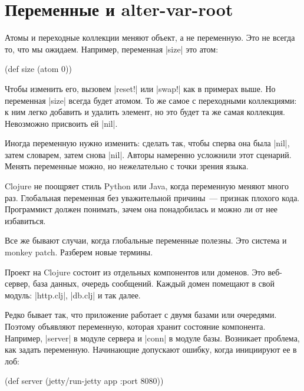 \section{Переменные и alter-var-root}

\label{alter-var-root}

Атомы и переходные коллекции меняют объект, а не переменную. Это не всегда то,
что мы ожидаем. Например, переменная \spverb|size| это атом:

\begin{english}
  \begin{clojure}
(def size (atom 0))
  \end{clojure}
\end{english}

Чтобы изменить его, вызовем \spverb|reset!| или \spverb|swap!| как в примерах
выше. Но переменная \spverb|size| всегда будет атомом. То же самое с переходными
коллекциями: к ним легко добавить и удалить элемент, но это будет та же самая
коллекция. Невозможно присвоить ей \spverb|nil|.

Иногда переменную нужно изменить: сделать так, чтобы сперва она была
\spverb|nil|, затем словарем, затем снова \spverb|nil|. Авторы намеренно
усложнили этот сценарий. Менять переменные можно, но нежелательно с точки зрения
языка.

Clojure не поощряет стиль Python или Java, когда переменную меняют много
раз. Глобальная переменная без уважительной причины~--- признак плохого кода.
Программист должен понимать, зачем она понадобилась и можно ли от нее
избавиться.

Все же бывают случаи, когда глобальные переменные полезны. Это система и monkey
patch. Разберем новые термины.

Проект на Clojure состоит из отдельных компонентов или доменов. Это веб-сервер,
база данных, очередь сообщений. Каждый домен помещают в свой модуль:
\spverb|http.clj|, \spverb|db.clj| и так далее.

Редко бывает так, что приложение работает с двумя базами или очередями. Поэтому
объявляют переменную, которая хранит состояние компонента. Например,
\spverb|server| в модуле сервера и \spverb|conn| в модуле базы. Возникает
проблема, как задать переменную. Начинающие допускают ошибку, когда инициируют
ее в лоб:

\begin{english}
  \begin{clojure}
(def server (jetty/run-jetty app {:port 8080}))
  \end{clojure}
\end{english}


